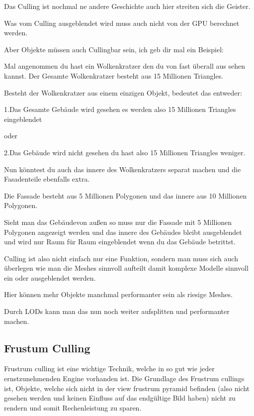Das Culling ist nochmal ne andere Geschichte auch hier streiten sich die Geister.



Was vom Culling ausgeblendet wird muss auch nicht von der GPU berechnet werden.

Aber Objekte müssen auch Cullingbar sein, ich geb dir mal ein Beispiel:



Mal angenommen du hast ein Wolkenkratzer den du von fast überall aus sehen kannst. Der Gesamte Wolkenkratzer besteht aus 15 Millionen Triangles.

Besteht der Wolkenkratzer aus einem einzigen Objekt, bedeutet das entweder:



1.Das Gesamte Gebäude wird gesehen es werden also 15 Millionen Triangles eingeblendet



oder



2.Das Gebäude wird nicht gesehen du hast also 15 Millionen Triangles weniger.



Nun könntest du auch das innere des Wolkenkratzers separat machen und die Fasadenteile ebenfalls extra.



Die Fassade besteht aus 5 Millionen Polygonen und das innere aus 10 Millionen Polygonen.

Sieht man das Gebäudevon außen so muss nur die Fassade mit 5 Millionen Polygonen angezeigt werden und das innere des Gebäudes bleibt ausgeblendet und wird nur Raum für Raum eingeblendet wenn du das Gebäude betrittst.



Culling ist also nicht einfach nur eine Funktion, sondern man muss sich auch überlegen wie man die Meshes sinnvoll aufteilt damit komplexe Modelle sinnvoll ein oder ausgeblendet werden.



Hier können mehr Objekte manchmal performanter sein als riesige Meshes.



Durch LODs kann man das nun noch weiter aufsplitten und performanter machen.
\cite{_cryengine_culling}

\subsection{Frustum Culling}
Frustrum culling ist eine wichtige Technik, welche in so gut wie jeder ernstzunehmenden Engine vorhanden ist. Die Grundlage des Frustrum cullings ist, Objekte, welche sich nicht in der view frustrum pyramid befinden (also nicht gesehen werden und keinen Einfluss auf das endgültige Bild haben) nicht zu rendern und somit Rechenleistung zu sparen.
\cite{_cryengine_culling}


